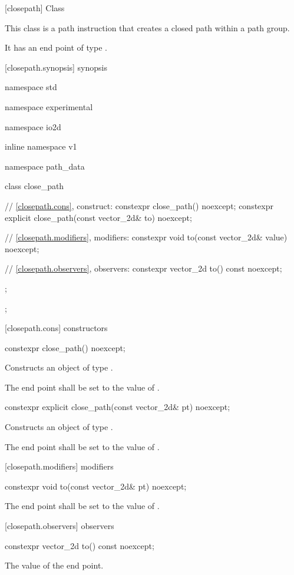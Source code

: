  [closepath] {Class }

\pnum
{}
This class is a path instruction that creates a closed path within a path group.

\pnum
It has an end point of type .

 [closepath.synopsis] { synopsis}

\begin{codeblock}
namespace std { namespace experimental { namespace io2d { inline namespace v1 {
  namespace path_data {
    class close_path {
      // \ref{closepath.cons}, construct:
      constexpr close_path() noexcept;
      constexpr explicit close_path(const vector_2d& to) noexcept;

      // \ref{closepath.modifiers}, modifiers:
      constexpr void to(const vector_2d& value) noexcept;

      // \ref{closepath.observers}, observers:
      constexpr vector_2d to() const noexcept;
    };
  };
} } } }
\end{codeblock}

 [closepath.cons] { constructors}

\begin{itemdecl}
constexpr close_path() noexcept;
\end{itemdecl}
\begin{itemdescr}
\pnum
\effects
Constructs an object of type .

\pnum
The end point shall be set to the value of .
\end{itemdescr}

\begin{itemdecl}
constexpr explicit close_path(const vector_2d& pt) noexcept;
\end{itemdecl}
\begin{itemdescr}
\pnum
\effects
Constructs an object of type .

\pnum
The end point shall be set to the value of .
\end{itemdescr}

 [closepath.modifiers]{ modifiers}

\begin{itemdecl}
constexpr void to(const vector_2d& pt) noexcept;
\end{itemdecl}
\begin{itemdescr}
\pnum
\effects
The end point shall be set to the value of .
\end{itemdescr}

 [closepath.observers]{ observers}

\begin{itemdecl}
constexpr vector_2d to() const noexcept;
\end{itemdecl}
\begin{itemdescr}
\pnum
\returns
The value of the end point.
\end{itemdescr}
